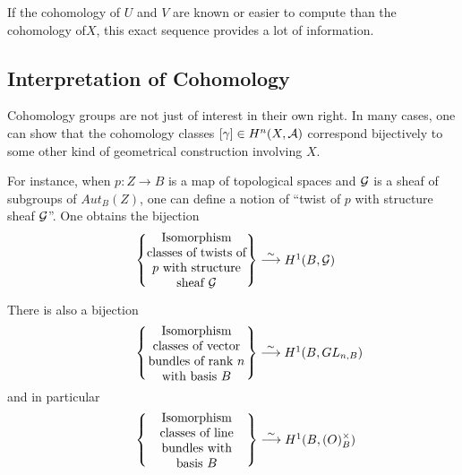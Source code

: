 If the cohomology of $U$ and $V$ are known or easier to compute than the cohomology of$X$, this exact sequence provides a lot of information.

\subsection{Interpretation of Cohomology}
Cohomology groups are not just of interest in their own right. In many cases, one can show that the cohomology classes $[\gamma] \in H^n(X, \mathcal{A})$ correspond bijectively to some other kind of geometrical construction involving $X$.

For instance, when $p:Z \to B$ is a map of topological spaces and $\mathcal{G}$  is a sheaf of subgroups of $Aut_B(Z)$, one can define a notion of “twist of $p$ with structure sheaf $\mathcal{G}$”. One obtains the bijection
\begin{align}
            \left\{ \parbox[c]{1.1in}{\centering
                       Isomorphism classes of twists of $p$
                       with structure sheaf $\Sh{G}$}
            \right\}
            \stackrel{\sim}{\to}
            \parbox[c]{0.5in}{\centering
                       $H^1(B, \Sh{G})$}
\end{align}

There is also a bijection
\begin{align}
            \left\{ \parbox[c]{1.1in}{\centering
              Isomorphism classes of vector bundles of rank $n$ with basis $B$}
            \right\}
            \stackrel{\sim}{\to}
            \parbox[c]{0.5in}{\centering
            $H^1(B, GL_{n,B})$}
\end{align}
and in particular
\begin{align}
            \left\{ \parbox[c]{1.1in}{\centering
            Isomorphism classes of line bundles with basis $B$}
            \right\}
            \stackrel{\sim}{\to}
            \parbox[c]{0.5in}{\centering
                $H^1(B, \Ring(O)_B^\times)$}
\end{align}
